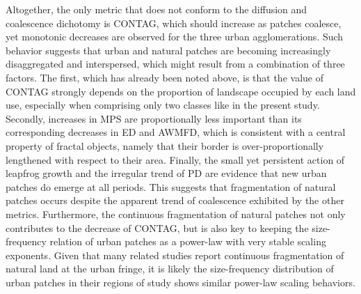 \documentclass[10pt,letterpaper]{article}
\begin{document}
Altogether, the only metric that does not conform to the diffusion and coalescence dichotomy is CONTAG, which should increase as patches coalesce, yet monotonic decreases are observed for the three urban agglomerations. Such behavior suggests that urban and natural patches are becoming increasingly disaggregated and interspersed, which might result from a combination of three factors.
The first, which has already been noted above, is that the value of CONTAG strongly depends on the proportion of landscape occupied by each land use, especially when comprising only two classes like in the present study.
Secondly, increases in MPS are proportionally less important than its corresponding decreases in ED and AWMFD, which is consistent with a central property of fractal objects, namely that their border is over-proportionally lengthened with respect to their area.
Finally, the small yet persistent action of leapfrog growth and the irregular trend of PD are evidence that new urban patches do emerge at all periods.
This suggests that fragmentation of natural patches occurs despite the apparent trend of coalescence exhibited by the other metrics.
Furthermore, the continuous fragmentation of natural patches not only contributes to the decrease of CONTAG, but is also key to keeping the size-frequency relation of urban patches as a power-law with very stable scaling exponents.
Given that many related studies report continuous fragmentation of natural land at the urban fringe, it is likely the size-frequency distribution of urban patches in their regions of study shows similar power-law scaling behaviors.
\end{document}
